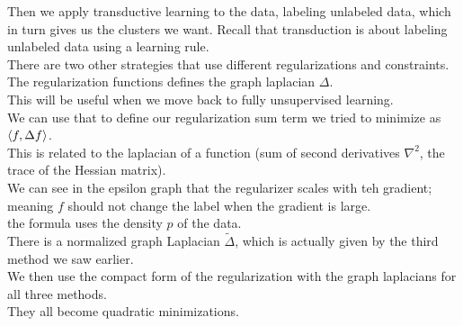 \documentclass[12pt]{article}
\begin{document}
Then we apply transductive learning to
the data, labeling unlabeled data, which in turn
gives us the clusters we want.
Recall that transduction is about labeling unlabeled
data using a learning rule. \\

There are two other strategies that use different
regularizations and constraints. \\

The regularization functions defines the graph
laplacian $\Delta$. \\
This will be useful when we move back to
fully unsupervised learning. \\

We can use that to define our regularization
sum term we tried to minimize as $\left\langle f, \Delta f \right\rangle$. \\

This is related to the laplacian of a function
(sum of second derivatives $\nabla^2$, the trace
of the Hessian matrix). \\

We can see in the epsilon graph that the regularizer
scales with teh gradient; meaning $f$ should not
change the label when the gradient is large. \\
the formula uses the density $p$ of the data. \\

There is a normalized graph Laplacian $\tilde{\Delta}$,
which is actually given by the third method we saw
earlier. \\

We then use the compact form of the regularization
with the graph laplacians for all three methods. \\
They all become quadratic minimizations. \\
\end{document}

